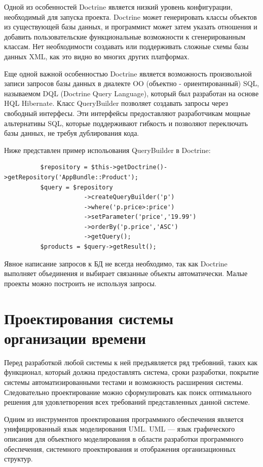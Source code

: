 Одной из особенностей Doctrine является низкий уровень конфигурации, необходимый для запуска проекта. Doctrine может генерировать классы объектов из существующей базы данных, и программист может затем указать отношения и добавить пользовательские функциональные возможности к сгенерированным классам. Нет необходимости создавать или поддерживать сложные схемы базы данных XML, как это видно во многих других платформах.

Еще одной важной особенностью Doctrine является возможность произвольной записи запросов базы данных в диалекте OO (объектно - ориентированный) SQL, называемом DQL (Doctrine Query Language), который был разработан на основе  HQL Hibernate. Класс QueryBuilder позволяет создавать запросы через свободный интерфесы. Эти интерфейсы предоставляют разработчикам мощные альтернативы SQL, которые поддерживают гибкость и позволяют переключать базы данных, не требуя дублирования кода.

Ниже представлен пример испольования QueryBuilder в Doctrine:
\begin{lstlisting}
          $repository = $this->getDoctrine()->getRepository('AppBundle::Product');
          $query = $repository
                      ->createQueryBuilder('p')
                      ->where('p.price>:price')
                      ->setParameter('price','19.99')
                      ->orderBy('p.price','ASC')
                      ->getQuery();
          $products = $query->getResult();
\end{lstlisting}

Явное написание запросов к БД не всегда необходимо, так как Doctrine выполняет объединения и выбирает связанные объекты автоматически. Малые проекты можно построить не используя запросы.

\section{Проектирования системы организации времени}

Перед разработкой любой системы к ней предъявляется ряд требовний, таких как функционал, который должна предоставлять система, сроки разработки, покрытие системы автоматизированными тестами и возможность расширения системы. Следовательно проектирование можно сформулировать как поиск оптимального решения для удовлетворения всех требований представленных данной системе.

Одним из инструментов проектирования программного обеспечения является унифицированный язык моделирования UML. UML — язык графического описания для объектного моделирования в области разработки программного обеспечения, системного проектирования и отображения организационных структур.

